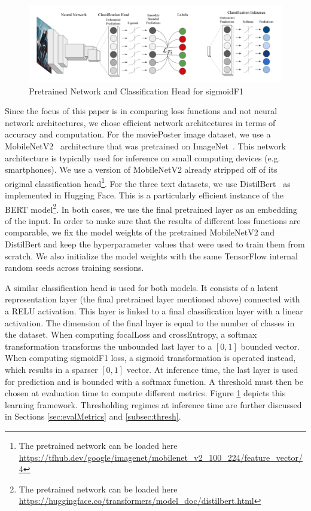 \begin{figure}[htbp]
\centering
\includegraphics[width=.9\linewidth]{./images/architecture.png}
\caption{\label{fig:architecture}
Pretrained Network and Classification Head for sigmoidF1 }
\end{figure}

Since the focus of this paper is in comparing loss functions and not neural network architectures, we chose efficient network architectures in terms of accuracy and computation.
For the moviePoster image dataset, we use a MobileNetV2~\cite{mobileNet} architecture that was pretrained on ImageNet~\cite{imagenet}. This network architecture is typically used for inference on small computing devices (e.g. smartphones). We use a version of MobileNetV2 already stripped off of its original classification head\footnote{The pretrained network can be loaded here \url{https://tfhub.dev/google/imagenet/mobilenet_v2_100_224/feature_vector/4}}.
For the three text datasets, we use DistilBert~\cite{distilBert} as implemented in Hugging Face. This is a particularly efficient instance of the BERT model\footnote{The pretrained network can be loaded here \url{https://huggingface.co/transformers/model_doc/distilbert.html}}. 
In both cases, we use the final pretrained layer as an embedding of the input. In order to make sure that the results of different loss functions are comparable, we fix the model weights of the pretrained MobileNetV2 and DistilBert and keep the hyperparameter values that were used to train them from scratch. We also initialize the model weights with the same TensorFlow internal random seeds across training sessions.

A similar classification head is used for both models. It consists of a latent representation layer (the final pretrained layer mentioned above) connected with a RELU activation. This layer is linked to a final classification layer with a linear activation. The dimension of the final layer is equal to the number of classes in the dataset. When computing focalLoss and crossEntropy, a softmax transformation transforms the unbounded last layer to a $[0,1]$ bounded vector. When computing sigmoidF1 loss, a sigmoid transformation is operated instead, which results in a sparser $[0,1]$ vector. At inference time, the last layer is used for prediction and is bounded with a softmax function. A threshold must then be chosen at evaluation time to compute different metrics. Figure \ref{fig:architecture} depicts this learning framework. Thresholding regimes at inference time are further discussed in Sections \ref{sec:evalMetrics} and \ref{subsec:thresh}.

